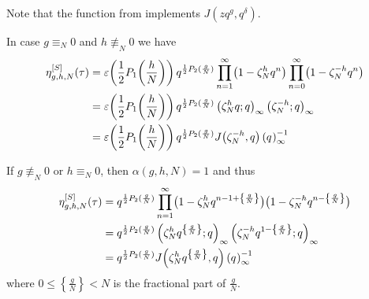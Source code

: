 \documentclass{article}
\begin{document}
Note that the function  from
 implements
$J(zq^g,q^\delta)$.





In case $g\equiv_N 0$ and $h\not\equiv_N 0$ we have
\begin{align*}
  \eta_{g,h,N}^{[S]}(\tau)
  &=
  \varepsilon\!\left(\frac{1}{2}
    P_1\!\left(\frac{h}{N}\right)\right)
    q^{\frac{1}{2} P_2(\frac{g}{N})}
  \prod_{n=1}^\infty
    \bigl(1-\zeta_N^h q^n\bigr)
  \prod_{n=0}^\infty
    \bigl(1-\zeta_N^{-h} q^n\bigr)
  \notag\\
  &=
  \varepsilon\!\left(\frac{1}{2}
    P_1\!\left(\frac{h}{N}\right)\right)
    q^{\frac{1}{2} P_2(\frac{g}{N})}
  \left( \zeta_N^h q;q \right)_{\infty}
  \left( \zeta_N^{-h};q \right)_{\infty}
  \notag\\
  &=
  \varepsilon\!\left(\frac{1}{2}
    P_1\!\left(\frac{h}{N}\right)\right)
    q^{\frac{1}{2} P_2(\frac{g}{N})}
    J\!\left(\zeta_N^{-h},q\right) \left({q}^{}\right)_{\infty}^{-1}
\end{align*}




If $g\not\equiv_N 0$ or $h\equiv_N 0$, then $\alpha(g,h,N)=1$ and thus
\begin{align*}
  \eta_{g,h,N}^{[S]}(\tau)
  &=
  q^{\frac{1}{2} P_2(\frac{g}{N})}
  \prod_{n=1}^\infty
    \bigl(1-\zeta_N^h q^{n-1 + \left\{\frac{g}{N}\right\}}\bigr)
    \bigl(1-\zeta_N^{-h} q^{n - \left\{\frac{g}{N}\right\}}\bigr)
  \notag\\
  &=
  q^{\frac{1}{2} P_2(\frac{g}{N})}
  \left( \zeta_N^h q^{\left\{\frac{g}{N}\right\}};q \right)_{\infty}
  \left( \zeta_N^{-h} q^{1-\left\{\frac{g}{N}\right\}};q \right)_{\infty}
  \notag\\
  &=
  q^{\frac{1}{2} P_2(\frac{g}{N})}
    J\!\left(\zeta_N^h q^{\left\{\frac{g}{N}\right\}},q\right)
    \left({q}^{}\right)_{\infty}^{-1}
\end{align*}
where $0\le\left\{\frac{g}{N}\right\}<N$ is the fractional part of
$\frac{g}{N}$.
\end{document}
